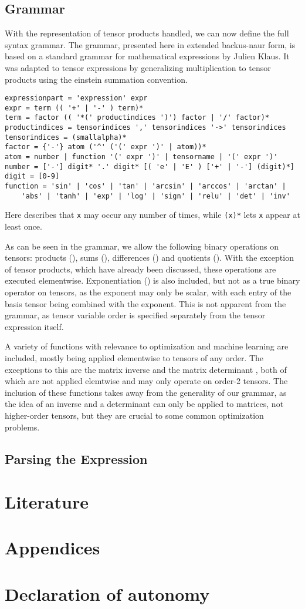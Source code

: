\documentclass[12pt, a4paper]{report}
\begin{document}
\section{Grammar}
With the representation of tensor products handled, we can now define the full syntax grammar.
The grammar, presented here in extended backus-naur form, is based on a standard grammar for mathematical expressions by Julien Klaus.
It was adapted to tensor expressions by generalizing multiplication to tensor products using the einstein summation convention.
\begin{verbatim}
expressionpart = 'expression' expr
expr = term (( '+' | '-' ) term)*
term = factor (( '*(' productindices ')') factor | '/' factor)*
productindices = tensorindices ',' tensorindices '->' tensorindices
tensorindices = (smallalpha)*
factor = {'-'} atom ('^' ('(' expr ')' | atom))*
atom = number | function '(' expr ')' | tensorname | '(' expr ')'
number = ['-'] digit* '.' digit* [( 'e' | 'E' ) ['+' | '-'] (digit)*]
digit = [0-9]
function = 'sin' | 'cos' | 'tan' | 'arcsin' | 'arccos' | 'arctan' | 
    'abs' | 'tanh' | 'exp' | 'log' | 'sign' | 'relu' | 'det' | 'inv'
\end{verbatim}
Here \texttt{} describes that \texttt{x} may occur any number of times, while \texttt{(x)*} lets \texttt{x} appear at least once.

As can be seen in the grammar, we allow the following binary operations on tensors: products (\codeword{*(,->)}), sums (\codeword{+}), differences (\codeword{-}) and quotients (\codeword{/}).
With the exception of tensor products, which have already been discussed, these operations are executed elementwise.
Exponentiation (\codeword{^}) is also included, but not as a true binary operator on tensors, as the exponent may only be scalar, with each entry of the basis tensor being combined with the exponent.
This is not apparent from the grammar, as tensor variable order is specified separately from the tensor expression itself.

A variety of functions with relevance to optimization and machine learning are included, mostly being applied elementwise to tensors of any order.
The exceptions to this are the matrix inverse  and the matrix determinant , both of which are not applied elemtwise and may only operate on order-2 tensors.
The inclusion of these functions takes away from the generality of our grammar, as the idea of an inverse and a determinant can only be applied to matrices, not higher-order tensors, but they are crucial to some common optimization problems.



\section{Parsing the Expression}


\chapter{Literature}
\chapter{Appendices}
\chapter{Declaration of autonomy}
\end{document}
